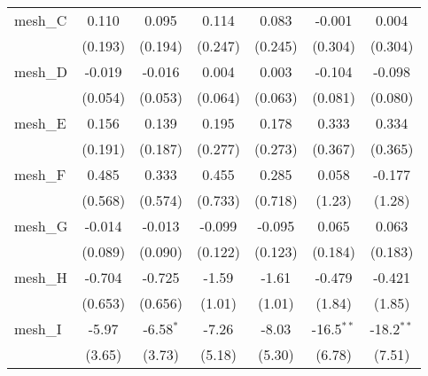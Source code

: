 \begin{tabular}{lcccccc}
   mesh\_C                                                     & 0.110         & 0.095        & 0.114        & 0.083        & -0.001         & 0.004\\   
                                                               & (0.193)       & (0.194)      & (0.247)      & (0.245)      & (0.304)        & (0.304)\\   
   mesh\_D                                                     & -0.019        & -0.016       & 0.004        & 0.003        & -0.104         & -0.098\\   
                                                               & (0.054)       & (0.053)      & (0.064)      & (0.063)      & (0.081)        & (0.080)\\   
   mesh\_E                                                     & 0.156         & 0.139        & 0.195        & 0.178        & 0.333          & 0.334\\   
                                                               & (0.191)       & (0.187)      & (0.277)      & (0.273)      & (0.367)        & (0.365)\\   
   mesh\_F                                                     & 0.485         & 0.333        & 0.455        & 0.285        & 0.058          & -0.177\\   
                                                               & (0.568)       & (0.574)      & (0.733)      & (0.718)      & (1.23)         & (1.28)\\   
   mesh\_G                                                     & -0.014        & -0.013       & -0.099       & -0.095       & 0.065          & 0.063\\   
                                                               & (0.089)       & (0.090)      & (0.122)      & (0.123)      & (0.184)        & (0.183)\\   
   mesh\_H                                                     & -0.704        & -0.725       & -1.59        & -1.61        & -0.479         & -0.421\\   
                                                               & (0.653)       & (0.656)      & (1.01)       & (1.01)       & (1.84)         & (1.85)\\   
   mesh\_I                                                     & -5.97         & -6.58$^{*}$  & -7.26        & -8.03        & -16.5$^{**}$   & -18.2$^{**}$\\   
                                                               & (3.65)        & (3.73)       & (5.18)       & (5.30)       & (6.78)         & (7.51)\\   

\end{tabular}

